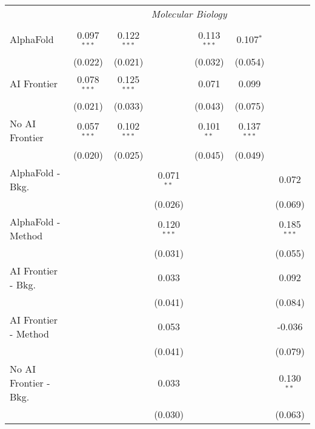 \begin{tabular}{lcccccc}
 & \multicolumn{6}{c}{\textit{Molecular Biology}} \\ \\
   AlphaFold               & 0.097$^{***}$ & 0.122$^{***}$ &               & 0.113$^{***}$ & 0.107$^{*}$   &   \\   
                           & (0.022)       & (0.021)       &               & (0.032)       & (0.054)       &   \\   
   AI Frontier             & 0.078$^{***}$ & 0.125$^{***}$ &               & 0.071         & 0.099         &   \\   
                           & (0.021)       & (0.033)       &               & (0.043)       & (0.075)       &   \\   
   No AI Frontier          & 0.057$^{***}$ & 0.102$^{***}$ &               & 0.101$^{**}$  & 0.137$^{***}$ &   \\   
                           & (0.020)       & (0.025)       &               & (0.045)       & (0.049)       &   \\   
   AlphaFold - Bkg.        &               &               & 0.071$^{**}$  &               &               & 0.072\\   
                           &               &               & (0.026)       &               &               & (0.069)\\   
   AlphaFold - Method      &               &               & 0.120$^{***}$ &               &               & 0.185$^{***}$\\   
                           &               &               & (0.031)       &               &               & (0.055)\\   
   AI Frontier - Bkg.      &               &               & 0.033         &               &               & 0.092\\   
                           &               &               & (0.041)       &               &               & (0.084)\\   
   AI Frontier - Method    &               &               & 0.053         &               &               & -0.036\\   
                           &               &               & (0.041)       &               &               & (0.079)\\   
   No AI Frontier - Bkg.   &               &               & 0.033         &               &               & 0.130$^{**}$\\   
                           &               &               & (0.030)       &               &               & (0.063)\\   

\end{tabular}
